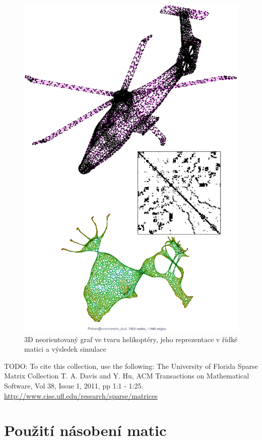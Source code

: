 \begin{figure}[H]
	\includegraphics[width=1.0\textwidth]{./images/commanche/commanche}
	\caption{3D neorientovaný graf ve tvaru helikoptéry, jeho reprezentace v řídké matici a výsledek simulace}
	\label{fig:commanche}
\end{figure}

TODO:
To cite this collection, use the following: The University of Florida Sparse Matrix Collection T. A. Davis and Y. Hu, ACM Transactions on Mathematical Software, Vol 38, Issue 1, 2011, pp 1:1 - 1:25. \url{http://www.cise.ufl.edu/research/sparse/matrices}

\section{Použití násobení matic}

